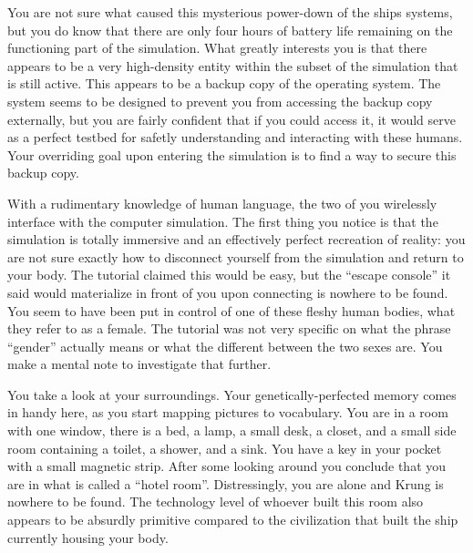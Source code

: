 \documentclass[char]{guildcamp1}
\begin{document}
You are not sure what caused this mysterious power-down of the ships systems, but you do know that there are only four hours of battery life remaining on the functioning part of the simulation. What greatly interests you is that there appears to be a very high-density entity within the subset of the simulation that is still active. This appears to be a backup copy of the operating system. The system seems to be designed to prevent you from accessing the backup copy externally, but you are fairly confident that if you could access it, it would serve as a perfect testbed for safetly understanding and interacting with these humans. Your overriding goal upon entering the simulation is to find a way to secure this backup copy.

With a rudimentary knowledge of human language, the two of you wirelessly interface with the computer simulation. The first thing you notice is that the simulation is totally immersive and an effectively perfect recreation of reality: you are not sure exactly how to disconnect yourself from the simulation and return to your body. The tutorial claimed this would be easy, but the ``escape console'' it said would materialize in front of you upon connecting is nowhere to be found. You seem to have been put in control of one of these fleshy human bodies, what they refer to as a female. The tutorial was not very specific on what the phrase ``gender'' actually means or what the different between the two sexes are. You make a mental note to investigate that further.

You take a look at your surroundings. Your genetically-perfected memory comes in handy here, as you start mapping pictures to vocabulary. You are in a room with one window, there is a bed, a lamp, a small desk, a closet, and a small side room containing a toilet, a shower, and a sink. You have a key in your pocket with a small magnetic strip. After some looking around you conclude that you are in what is called a ``hotel room''. Distressingly, you are alone and Krung is nowhere to be found. The technology level of whoever built this room also appears to be absurdly primitive compared to the civilization that built the ship currently housing your body.
\end{document}
